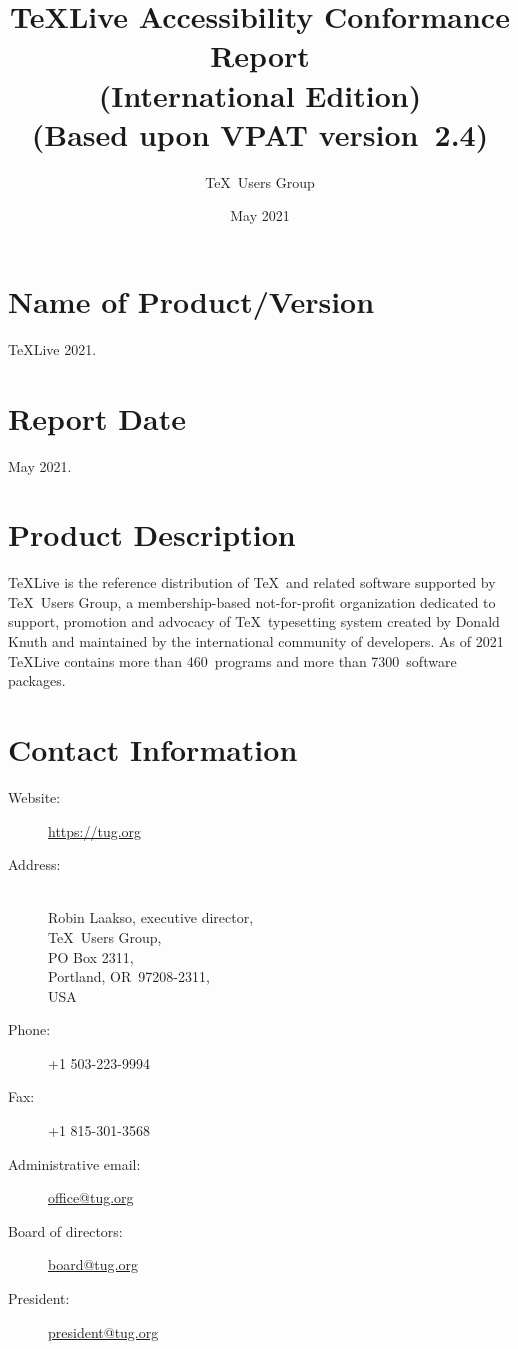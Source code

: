 \documentclass[a4paper]{report}
\begin{document}
\title{\TeX Live Accessibility Conformance Report\\
  (International Edition)\\
(Based upon VPAT\textsuperscript{\textregistered} version~2.4)}
\author{\TeX\ Users Group}
\date{May 2021}
\maketitle

\clearpage

\tableofcontents

\clearpage

\section{Name of Product/Version}
\label{sec:name}

\TeX Live 2021.


\section{Report Date}
\label{sec:date}

May 2021.


\section{Product Description}
\label{sec:description}

\TeX Live is the reference distribution of \TeX\ and related software
supported by \TeX\ Users Group, a membership-based not-for-profit
organization dedicated to support, promotion and advocacy of \TeX\
typesetting system created by Donald Knuth and maintained by the
international community of developers.  As of 2021 \TeX Live contains
more than 460~programs and more than 7300~software packages.

\section{Contact Information}
\label{sec:contact_info}

  \begin{description}
  \item[Website:]  \url{https://tug.org}
  \item[Address:] \leavevmode\\
    Robin Laakso, executive director,\\
    \TeX\ Users Group,\\
    PO Box 2311,\\
    Portland, OR~97208-2311,\\
    USA
  \item[Phone:] +1 503-223-9994
  \item[Fax:] +1 815-301-3568
  \item[Administrative email:] \href{mailto:office@tug.org}{office@tug.org}
  \item[Board of directors:] \href{mailto:board@tug.org}{board@tug.org}
  \item[President:] \href{mailto:president@tug.org}{president@tug.org}
  \end{description}
\end{document}
